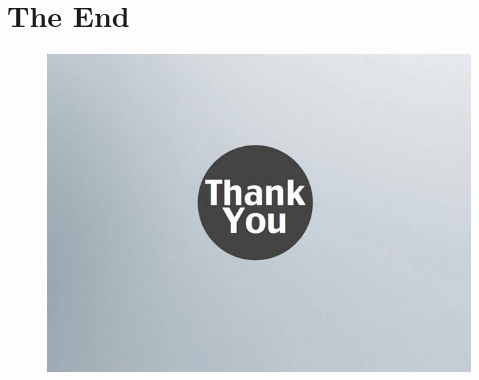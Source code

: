 \documentclass{beamer}
\begin{document}
\section*{The End}
\begin{frame}
\begin{figure}
\centering
\includegraphics[width=\textwidth]{./fig/thank_you.jpg}
\end{figure}

\end{frame}
\end{document}
